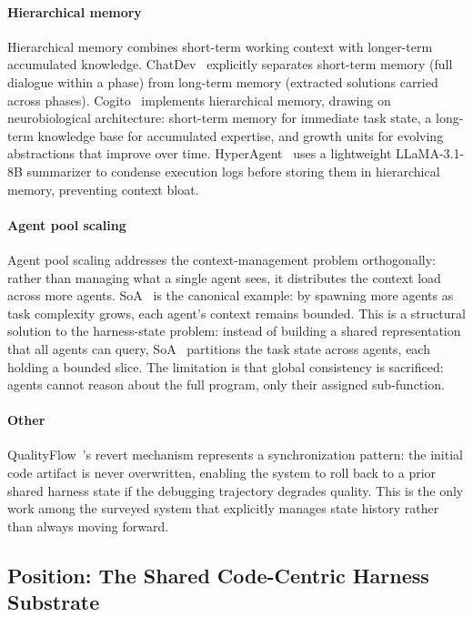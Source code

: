 \documentclass{llmxive}
\begin{document}
\paragraph{Hierarchical memory} Hierarchical memory combines
short-term working context with longer-term accumulated
knowledge. ChatDev~\cite{Qian2023ChatDev} explicitly separates
short-term memory (full dialogue within a phase) from long-term
memory (extracted solutions carried across phases).
Cogito~\cite{Li2025Cogito} implements hierarchical memory, drawing on
neurobiological architecture: short-term memory for immediate
task state, a long-term knowledge base for accumulated expertise,
and growth units for evolving abstractions that improve over
time. HyperAgent~\cite{Phan2024HyperAgent} uses a lightweight
LLaMA-3.1-8B summarizer to condense execution logs before storing
them in hierarchical memory, preventing context bloat.

\paragraph{Agent pool scaling} Agent pool scaling addresses the
context-management problem orthogonally: rather than managing
what a single agent sees, it distributes the context load across
more agents. SoA~\cite{Ishibashi2024SelfOrganized} is the
canonical example: by spawning more agents as task complexity
grows, each agent's context remains bounded. This is a
structural solution to the harness-state problem: instead of
building a shared representation that all agents can query,
SoA~\cite{Ishibashi2024SelfOrganized} partitions the task state
across agents, each holding a bounded slice. The limitation is
that global consistency is sacrificed: agents cannot reason about
the full program, only their assigned sub-function.

\paragraph{Other}
QualityFlow~\cite{Hu2025QualityFlow}'s revert mechanism
represents a synchronization pattern: the initial code artifact is never overwritten,
enabling the system to roll back to a prior shared harness state
if the debugging trajectory degrades quality. This is the only
work among the surveyed system that explicitly manages state history rather than always
moving forward.

\subsection{Position: The Shared Code-Centric Harness Substrate}
\end{document}
